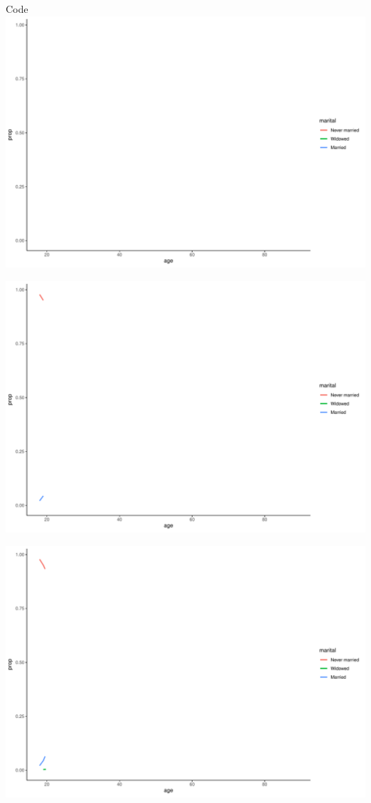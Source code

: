 \documentclass[
  ignorenonframetext,
]{beamer}
\begin{document}
\begin{frame}[fragile]{Code}
\includegraphics{gss_cat_files/figure-beamer/unnamed-chunk-1-5.pdf}

\includegraphics{gss_cat_files/figure-beamer/unnamed-chunk-1-6.pdf}

\includegraphics{gss_cat_files/figure-beamer/unnamed-chunk-1-7.pdf}


\end{frame}
\end{document}
